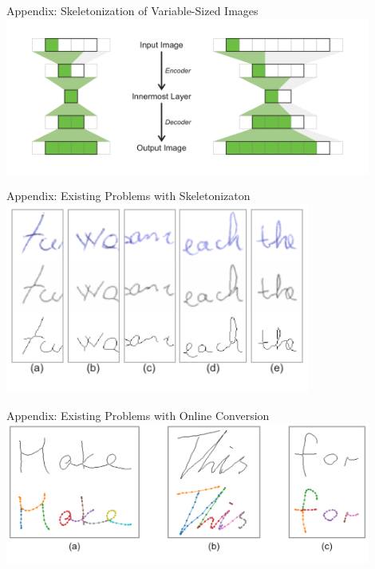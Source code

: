 \documentclass[aspectratio=169]{beamer}
\begin{document}
\begin{frame}{Appendix: Skeletonization of Variable-Sized Images}
  \centering
  \vspace{1em}
  \includegraphics[width=0.9\textwidth]{../thesis/assets/pix2pixScaling.pdf}
\end{frame}

\begin{frame}{Appendix: Existing Problems with Skeletonizaton}
    \centering
    \vspace{1em}
    \includegraphics[width=0.75\textwidth]{../thesis/assets/skeletonization/compare_fail/fail_table.pdf}
\end{frame}

\begin{frame}{Appendix: Existing Problems with Online Conversion}
    \centering
    \vspace{1em}
    \includegraphics[width=0.90\textwidth]{../thesis/assets/sampling/fails/fails.pdf}
\end{frame}
\end{document}

